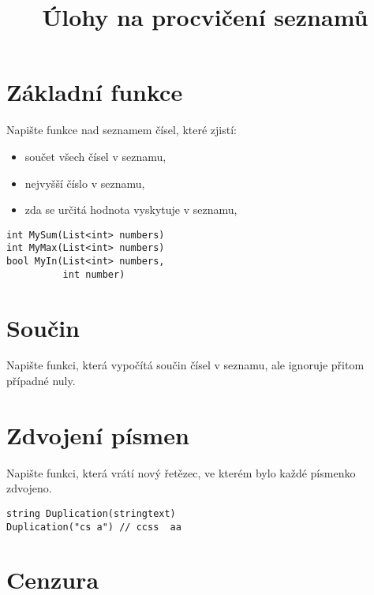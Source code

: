 \documentclass[12pt,a4paper]{article}
\begin{document}
\pagestyle{empty}
\title{Úlohy na procvičení seznamů}
\date{\vspace{-10ex}}
\setlength{\droptitle}{-6em}
\maketitle

\setlength\parindent{0pt}

\begin{multicols}{2}

\section{Základní funkce}

Napište funkce nad seznamem čísel, které zjistí:

\begin{itemize}[noitemsep,nolistsep]
	\item součet všech čísel v seznamu,
	\item nejvyšší číslo v seznamu,
	\item zda se určitá hodnota vyskytuje v seznamu,
\end{itemize}

\begin{verbatim}
int MySum(List<int> numbers)
int MyMax(List<int> numbers)
bool MyIn(List<int> numbers,
          int number)
\end{verbatim}

\section{Součin}

Napište funkci, která vypočítá součin čísel v seznamu, ale ignoruje přitom
případné nuly.

\section{Zdvojení písmen}

Napište funkci, která vrátí nový řetězec, ve kterém bylo každé písmenko
zdvojeno.

\begin{verbatim}
string Duplication(stringtext)
Duplication("cs a") // ccss  aa
\end{verbatim}

\section{Cenzura}


\end{multicols}
\end{document}
